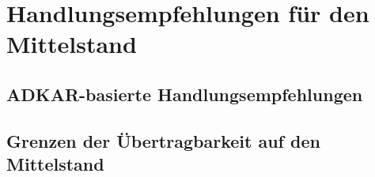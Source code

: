 \section{Handlungsempfehlungen für den Mittelstand}

\subsection{ADKAR-basierte Handlungsempfehlungen}

\subsection{Grenzen der \"Ubertragbarkeit auf den Mittelstand}
